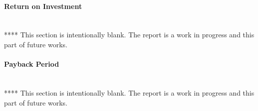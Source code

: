 \paragraph{Return on Investment}
~\\
****
\newline
This section is intentionally blank. The report is a work in progress and this part of future works.  

\paragraph{Payback Period}
~\\
****
\newline
This section is intentionally blank. The report is a work in progress and this part of future works.  

